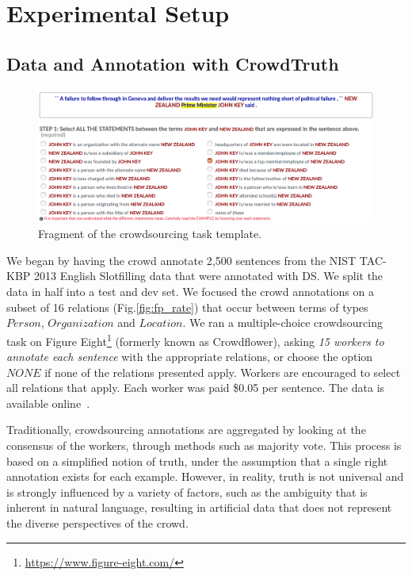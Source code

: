 




\section{Experimental Setup}

\subsection{Data and Annotation with CrowdTruth}


\begin{figure}[htb!]
\centering
\includegraphics[width=\textwidth]{img/odrelex.png}
\caption{Fragment of the crowdsourcing task template.}
\label{fig:template}
\end{figure}

We began by having the crowd annotate 2,500 sentences from the NIST TAC-KBP 2013 English Slotfilling data that were annotated with DS.  We split the data in half into a test and dev set. We focused the crowd annotations on a subset of 16 relations (Fig.\ref{fig:fp_rate}) that occur between terms of types $Person$, $Organization$ and $Location$. We ran a multiple-choice crowdsourcing task on Figure Eight\footnote{\url{https://www.figure-eight.com/}} (formerly known as Crowdflower), asking {\em 15 workers to annotate each sentence} with the appropriate relations, or choose the option $NONE$ if none of the relations presented apply. Workers are encouraged to select all relations that apply. Each worker was paid \$0.05 per sentence. The data is available online~\cite{crowdODrelexdata2016}. 

Traditionally, crowdsourcing annotations are aggregated by looking at the consensus of the workers, through methods such as majority vote. This process is based on a simplified notion of truth, under the assumption that a single right annotation exists for each example. However, in reality, truth is not universal and is strongly influenced by a variety of factors, such as the ambiguity that is inherent in natural language, resulting in artificial data that does not represent the diverse perspectives of the crowd.

